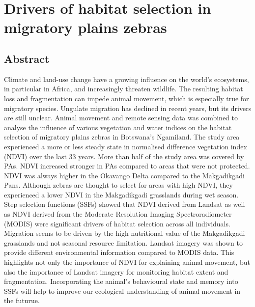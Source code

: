 \documentclass[12pt,a4paper, twoside, english]{article}
\begin{document}
\newpage
\section{Drivers of habitat selection in migratory plains zebras}


\subsection{Abstract}


Climate and land-use change have a growing influence on the world's ecosystems, in particular in Africa, and increasingly threaten wildlife. The resulting habitat loss and fragmentation can impede animal movement, which is especially true for migratory species. Ungulate migration has declined in recent years, but its drivers are still unclear. Animal movement and remote sensing data was combined to analyse the influence of various vegetation and water indices on the habitat selection of migratory plains zebras in Botswana's Ngamiland. The study area experienced a more or less steady state in normalised difference vegetation index (NDVI) over the last 33 years. More than half of the study area was covered by PAs. NDVI increased stronger in PAs compared to areas that were not protected. NDVI was always higher in the Okavango Delta compared to the Makgadikgadi Pans. Although zebras are thought to select for areas with high NDVI, they experienced a lower NDVI in the Makgadikgadi grasslands during wet season. Step selection functions (SSFs) showed that NDVI derived from Landsat as well as NDVI derived from the Moderate Resolution Imaging Spectroradiometer (MODIS) were significant drivers of habitat selection across all individuals. Migration seems to be driven by the high nutritional value of the Makgadikgadi grasslands and not seasonal resource limitation. Landsat imagery was shown to provide different environmental information compared to MODIS data. This highlights not only the importance of NDVI for explaining animal movement, but also the importance of Landsat imagery for monitoring habitat extent and fragmentation. Incorporating the animal's behavioural state and memory into SSFs will help to improve our ecological understanding of animal movement in the futurue. \\
\end{document}
